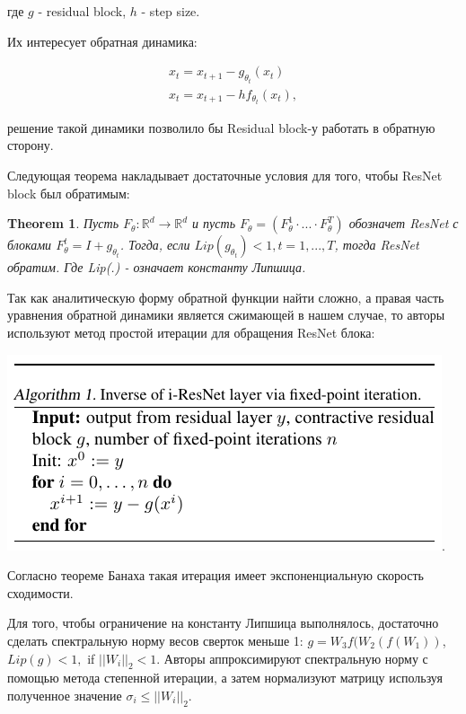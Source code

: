 \documentclass{article}
\newtheorem{theorem}{Theorem}
\begin{document}
где $g$ - residual block, $h$ - step size.

Их интересует обратная динамика: 

\begin{equation*}
\begin{aligned}
    x_{t} = x_{t+1} - g_{\theta_t} (x_t) \\
    x_{t} = x_{t+1} - h f_{\theta_t} (x_t), 
\end{aligned}
\end{equation*}

решение такой динамики позволило бы Residual block-у работать в обратную сторону.

Следующая теорема накладывает достаточные условия для того, чтобы ResNet block был обратимым:

\begin{theorem}
Пусть $F_\theta : \mathbb{R}^d \rightarrow \mathbb{R}^d$ и пусть $F_\theta = (F_\theta^1 \cdot ... \cdot F_\theta^T)$ обозначет ResNet с блоками $F_\theta^t = I + g_{\theta_t}$. Тогда, если $Lip(g_{\theta_t}) < 1, t = 1,...,T$, тогда ResNet обратим. Где Lip(.) - означает константу Липшица.
\end{theorem}

Так как аналитическую форму обратной функции найти сложно, а правая часть уравнения обратной динамики является сжимающей в нашем случае, то авторы используют метод простой итерации для обращения ResNet блока:

\includegraphics[scale=0.6]{iter_algo.png}.

Согласно теореме Банаха такая итерация имеет экспоненциальную скорость сходимости.

Для того, чтобы ограничение на константу Липшица выполнялось, достаточно сделать спектральную норму весов сверток меньше 1: $g = W_3f(W_2(f(W_1))$, $Lip(g) < 1, $ if $||W_i||_2 < 1$.
Авторы аппроксимируют спектральную норму с помощью метода степенной итерации, а затем нормализуют матрицу используя полученное значение $\sigma_i \leq ||W_i||_2.$
\end{document}
